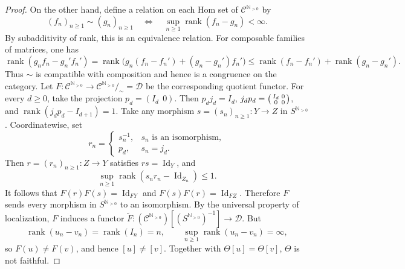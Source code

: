 \documentclass[10pt,a4paper]{amsart}
\theoremstyle{plain}
\theoremstyle{definition}
\theoremstyle{remark}
\begin{document}
\begin{proof}
  On the other hand, define a relation on each Hom set of $\mathcal C^{\mathbb N_{>0}}$ by
  \[
    (f_n)_{n\geq1}\sim(g_n)_{n\geq1}
    \quad\Longleftrightarrow\quad
    \sup_{n\geq1}\operatorname{rank}(f_n-g_n)<\infty.
  \]
  By subadditivity of rank, this is an equivalence relation.
  For composable families of matrices, one has
  \[
    \operatorname{rank}(g_nf_n-g_n'f_n')
    =\operatorname{rank}\bigl( g_n(f_n-f_n')+(g_n-g_n')f_n'\bigr)\leq\operatorname{rank}(f_n-f_n')+\operatorname{rank}(g_n-g_n').
  \]
  Thus $\sim$ is compatible with composition and hence is a congruence on the category.
  Let $F:\mathcal C^{\mathbb N_{>0}} \longrightarrow \mathcal{C}^{\mathbb N_{>0}}/_\sim = \mathcal{D}$ be the corresponding quotient functor.
  For every $d\geq0$, take the projection $p_d=(I_d\ \ 0)$.
  Then $p_dj_d=I_d$, $j_dp_d= \begin{psmallmatrix}I_d&0\\0&0\end{psmallmatrix}$, and $\operatorname{rank}(j_dp_d-I_{d+1})=1$.
  Take any morphism $s=(s_n)_{n\geq1}:Y\longrightarrow Z$ in $S^{\mathbb N_{>0}}$.
  Coordinatewise, set
  \[
    r_n=
    \begin{cases}
      s_n^{-1}, & s_n\text{ is an isomorphism}, \\
      p_d,      & s_n=j_d.
    \end{cases}
  \]
  Then $r=(r_n)_{n\geq1}:Z\longrightarrow Y$ satisfies $rs=\operatorname{Id}_Y$, and
  \[
    \sup_{n\geq1}\operatorname{rank}
    (s_nr_n-\operatorname{Id}_{Z_n})\leq1.
  \]
  It follows that $F(r)F(s)=\operatorname{Id}_{FY}$ and $F(s)F(r)=\operatorname{Id}_{FZ}$.
  Therefore $F$ sends every morphism in $S^{\mathbb N_{>0}}$ to an isomorphism.
  By the universal property of localization, $F$ induces a functor $\widetilde F: (\mathcal C^{\mathbb N_{>0}}) [(S^{\mathbb N_{>0}})^{-1}] \longrightarrow \mathcal{D}$.
  But
  \[
    \operatorname{rank}(u_n-v_n)
    =\operatorname{rank}(I_n)=n,
    \qquad
    \sup_{n\geq1}\operatorname{rank}(u_n-v_n)=\infty,
  \]
  so $F(u)\ne F(v)$, and hence $[u]\ne[v]$.
  Together with $\Theta[u]=\Theta[v]$, $\Theta$ is not faithful.
\end{proof}
\end{document}
